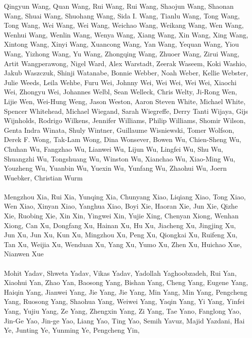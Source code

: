 \documentclass[11pt]{article}
\begin{document}
\begin{description}[itemsep=4mm, style=nextline]
Qingyun Wang, 
Quan Wang, 
Rui Wang, 
Rui Wang, 
Shaojun Wang, 
Shaonan Wang, 
Shuai Wang, 
Shuohang Wang, 
Sida I. Wang, 
Tianlu Wang, 
Tong Wang, 
Tong Wang, 
Wei Wang, 
Wei Wang, 
Weichao Wang, 
Weikang Wang, 
Wen Wang, 
Wenhui Wang, 
Wenlin Wang, 
Wenya Wang, 
Xiang Wang, 
Xin Wang, 
Xing Wang, 
Xintong Wang, 
Xinyi Wang, 
Xuancong Wang, 
Yan Wang, 
Yequan Wang, 
Yiou Wang, 
Yizhong Wang, 
Yu Wang, 
Zhongqing Wang, 
Zhuoer Wang, 
Zirui Wang, 
Artit Wangperawong, 
Nigel Ward, 
Alex Warstadt, 
Zeerak Waseem, 
Koki Washio, 
Jakub Waszczuk, 
Shinji Watanabe, 
Bonnie Webber, 
Noah Weber, 
Kellie Webster, 
Julie Weeds, 
Leila Wehbe, 
Furu Wei, 
Johnny Wei, 
Wei Wei, 
Wei Wei, 
Xiaochi Wei, 
Zhongyu Wei, 
Johannes Welbl, 
Sean Welleck, 
Chris Welty, 
Ji-Rong Wen, 
Lijie Wen, 
Wei-Hung Weng, 
Jason Weston, 
Aaron Steven White, 
Michael White, 
Spencer Whitehead, 
Michael Wiegand, 
Sarah Wiegreffe, 
Derry Tanti Wijaya, 
Gijs Wijnholds, 
Rodrigo Wilkens, 
Jennifer Williams, 
Philip Williams, 
Shomir Wilson, 
Genta Indra Winata, 
Shuly Wintner, 
Guillaume Wisniewski, 
Tomer Wolfson, 
Derek F. Wong, 
Tak-Lam Wong, 
Dina Wonsever, 
Bowen Wu, 
Chien-Sheng Wu, 
Chuhan Wu, 
Fangzhao Wu, 
Lianwei Wu, 
Lijun Wu, 
Lingfei Wu, 
Shu Wu, 
Shuangzhi Wu, 
Tongshuang Wu, 
Winston Wu, 
Xianchao Wu, 
Xiao-Ming Wu, 
Youzheng Wu, 
Yuanbin Wu, 
Yuexin Wu, 
Yunfang Wu, 
Zhaohui Wu, 
Joern Wuebker, 
Christian Wurm
\\
\\
Mengzhou Xia, 
Rui Xia, 
Yunqing Xia, 
Chunyang Xiao, 
Liqiang Xiao, 
Tong Xiao, 
Wen Xiao, 
Xinyan Xiao, 
Yanghua Xiao, 
Boyi Xie, 
Haoran Xie, 
Jun Xie, 
Qizhe Xie, 
Ruobing Xie, 
Xin Xin, 
Yingwei Xin, 
Yujie Xing, 
Chenyan Xiong, 
Wenhan Xiong, 
Can Xu, 
Dongfang Xu, 
Hainan Xu, 
Hu Xu, 
Jiacheng Xu, 
Jingjing Xu, 
Jun Xu, 
Jun Xu, 
Kun Xu, 
Mingzhou Xu, 
Peng Xu, 
Qiongkai Xu, 
Ruifeng Xu, 
Tan Xu, 
Weijia Xu, 
Wenduan Xu, 
Yang Xu, 
Yumo Xu, 
Zhen Xu, 
Huichao Xue, 
Nianwen Xue
\\
\\
Mohit Yadav, 
Shweta Yadav, 
Vikas Yadav, 
Yadollah Yaghoobzadeh, 
Rui Yan, 
Xiaohui Yan, 
Zhao Yan, 
Baosong Yang, 
Bishan Yang, 
Cheng Yang, 
Eugene Yang, 
Haiqin Yang, 
Jianwei Yang, 
Jie Yang, 
Jie Yang, 
Min Yang, 
Min Yang, 
Pengcheng Yang, 
Ruosong Yang, 
Shaohua Yang, 
Weiwei Yang, 
Yaqin Yang, 
Yi Yang, 
Yinfei Yang, 
Yujiu Yang, 
Ze Yang, 
Zhengxin Yang, 
Zi Yang, 
Tae Yano, 
Fanglong Yao, 
Jin-Ge Yao, 
Jin-ge Yao, 
Liang Yao, 
Ting Yao, 
Semih Yavuz, 
Majid Yazdani, 
Hai Ye, 
Junting Ye, 
Yunming Ye, 
Pengcheng Yin, 

\end{description}
\end{document}
